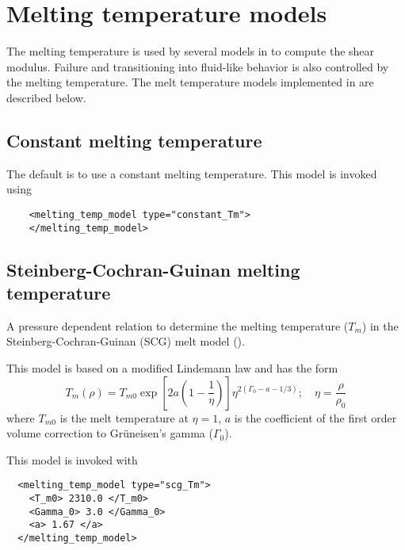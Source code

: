 \chapter{Melting temperature models}
The melting temperature is used by several models in \Vaango to compute the shear modulus.
Failure and transitioning into fluid-like behavior is also controlled by the melting
temperature.  The melt temperature models implemented in \Vaango are described below.

\section{Constant melting temperature}
The default is to use a constant melting temperature.  This model
is invoked using
\lstset{language=XML}
\begin{lstlisting}  
    <melting_temp_model type="constant_Tm">
    </melting_temp_model>
\end{lstlisting}  

\section{Steinberg-Cochran-Guinan melting temperature}
A pressure dependent relation to determine the melting 
temperature ($T_m$) in the Steinberg-Cochran-Guinan (SCG) melt model 
(\cite{Steinberg1980}).

This model is based on a modified Lindemann law and has the form
\begin{equation} \label{eq:TmSCG}
  T_m(\rho) = T_{m0} \exp\left[2a\left(1-\frac{1}{\eta}\right)\right]
            \eta^{2(\Gamma_0-a-1/3)}; \quad
  \eta = \frac{\rho}{\rho_0}
\end{equation}
where $T_{m0}$ is the melt temperature at $\eta = 1$, 
$a$ is the coefficient of the first order volume correction to 
Gr{\"u}neisen's gamma ($\Gamma_0$).  

This model is invoked with
\lstset{language=XML}
\begin{lstlisting}
  <melting_temp_model type="scg_Tm">
    <T_m0> 2310.0 </T_m0>
    <Gamma_0> 3.0 </Gamma_0>
    <a> 1.67 </a>
  </melting_temp_model>
\end{lstlisting}

